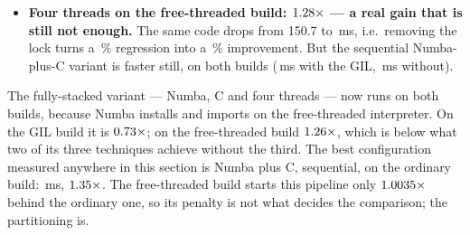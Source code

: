 \begin{itemize}[leftmargin=1.4em,itemsep=1pt]
        \,ms). The per-record loop is Python-level bytecode, so the GIL serialises it, and
        the chunking and thread management are pure overhead.
  \item \textbf{Four threads on the free-threaded build: $\meas{ratio:b7_pipeline-ft:end_to_end/ft/v0_pure|b7_pipeline-ft:end_to_end/ft/v3_native_threads}{1.28}\times$ --- a real gain that is
        still not enough.} The same code drops from 150.7 to \,ms, i.e.\ removing the lock
        turns a \,\% regression into a \,\% improvement. But the sequential Numba-plus-C
        variant is faster still, on both builds (\,ms with the GIL, \,ms without).
\end{itemize}

The fully-stacked variant --- Numba, C and four threads --- now runs on both builds, because
Numba installs and imports on the free-threaded interpreter. On the GIL build it is
$\meas{ratio:b7_pipeline-gil:end_to_end/gil/v0_pure|b7_pipeline-gil:end_to_end/gil/v4_all}{0.73}\times$; on the free-threaded build $\meas{ratio:b7_pipeline-ft:end_to_end/ft/v0_pure|b7_pipeline-ft:end_to_end/ft/v4_all}{1.26}\times$, which is below what two of its three
techniques achieve without the third. The best configuration measured anywhere in this section
is Numba plus C, sequential, on the ordinary build: \,ms, $\meas{ratio:b7_pipeline-gil:end_to_end/gil/v0_pure|b7_pipeline-gil:end_to_end/gil/v2_numba_native}{1.35}\times$. The free-threaded
build starts this pipeline only $\meas{ratio:b7_pipeline-ft:end_to_end/ft/v0_pure|b7_pipeline-gil:end_to_end/gil/v0_pure}{1.0035}\times$ behind the ordinary one, so its penalty is not
what decides the comparison; the partitioning is.

